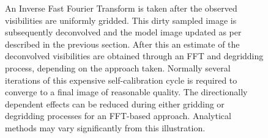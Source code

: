 \documentclass[a4paper,10pt]{report}
\begin{document}
\begin{figure}[h]
\begin{mdframed}
{ An Inverse Fast Fourier Transform is taken after the observed visibilities are uniformly gridded. This dirty sampled image is subsequently deconvolved and the model image updated as per 
 described in the previous section. After this an estimate of the deconvolved visibilities are obtained through an FFT and degridding process, depending on the approach taken. Normally several iterations 
 of this expensive self-calibration cycle is required to converge to a final image of reasonable quality. The directionally dependent effects can be reduced during either gridding 
 or degridding processes for an FFT-based approach. Analytical methods may vary significantly from this illustration.}
 \label{fig_image_cycle}
 \end{mdframed}
 \end{figure}
 
\end{document}
